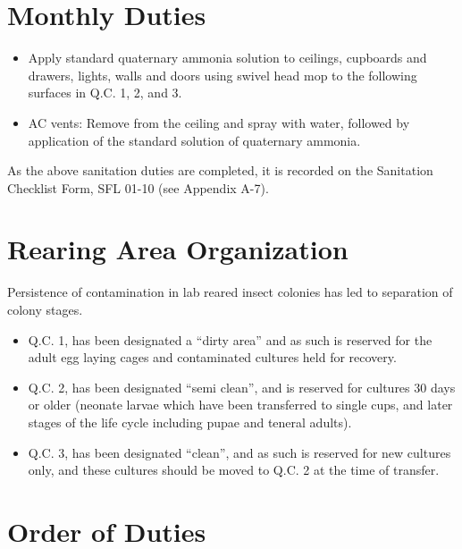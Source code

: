 \documentclass{sop_class}[overrideChapters] %
\providecommand{\tightlist}{%
  \setlength{\itemsep}{0pt}\setlength{\parskip}{0pt}}
\begin{document}
{{\section{Monthly Duties}\label{monthly-duties}}
\begin{itemize}
\tightlist
\item
  Apply standard quaternary ammonia solution to ceilings, cupboards
  and drawers, lights, walls and doors using swivel head mop to the
  following surfaces in Q.C. 1, 2, and 3.
\item
  AC vents: Remove from the ceiling and spray with water, followed by
  application of the standard solution of quaternary ammonia.
\end{itemize}
As the above sanitation duties are completed, it is recorded on the
Sanitation Checklist Form, SFL 01-10 (see Appendix A-7).

\hypertarget{rearing-organization}{%
\section{Rearing Area Organization}\label{rearing-organization}}

Persistence of contamination in lab reared insect colonies has led to
separation of colony stages.
\begin{itemize}
\item
  Q.C. 1, has been designated a ``dirty area'' and as such is reserved
  for the adult egg laying cages and contaminated cultures held for
  recovery.
\item
  Q.C. 2, has been designated ``semi clean'', and is reserved for
  cultures 30 days or older (neonate larvae which have been
  transferred to single cups, and later stages of the life cycle
  including pupae and teneral adults).
\item
  Q.C. 3, has been designated ``clean'', and as such is reserved for new
  cultures only, and these cultures should be moved to Q.C. 2 at the
  time of transfer.
\end{itemize}
\hypertarget{order-of-duties}{%
\section{Order of Duties}\label{order-of-duties}}

}
\end{document}
